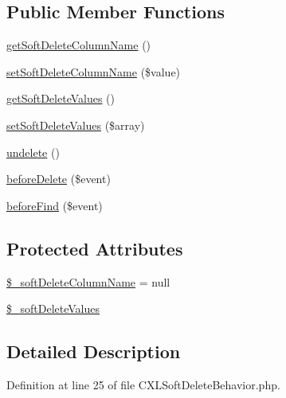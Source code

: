 \subsection*{Public Member Functions}
\begin{DoxyCompactItemize}
\item 
\hyperlink{classCXLSoftDeleteBehavior_a8b97dc6e43a81ad5f0eff95d328e189e}{getSoftDeleteColumnName} ()
\item 
\hyperlink{classCXLSoftDeleteBehavior_a9defa1ad4922f0989fb4a871e0ae1d30}{setSoftDeleteColumnName} (\$value)
\item 
\hyperlink{classCXLSoftDeleteBehavior_a84870a429f67ad3a7166b51edb27728d}{getSoftDeleteValues} ()
\item 
\hyperlink{classCXLSoftDeleteBehavior_ad6f2a8929e6d6875a709cab43e37287b}{setSoftDeleteValues} (\$array)
\item 
\hyperlink{classCXLSoftDeleteBehavior_a9c49f1fbbec2cb6693f6566bafd3683c}{undelete} ()
\item 
\hyperlink{classCXLSoftDeleteBehavior_a470a61d16341c345d6cebeb932890113}{beforeDelete} (\$event)
\item 
\hyperlink{classCXLSoftDeleteBehavior_a0d137abaa3f9f1ae67349e02c627ac26}{beforeFind} (\$event)
\end{DoxyCompactItemize}
\subsection*{Protected Attributes}
\begin{DoxyCompactItemize}
\item 
\hyperlink{classCXLSoftDeleteBehavior_a9763b131149e72b641d056ae5e693502}{\$\_\-softDeleteColumnName} = null
\item 
\hyperlink{classCXLSoftDeleteBehavior_a5c8f6d3104b63b74d01187b6a400106b}{\$\_\-softDeleteValues}
\end{DoxyCompactItemize}


\subsection{Detailed Description}


Definition at line 25 of file CXLSoftDeleteBehavior.php.




